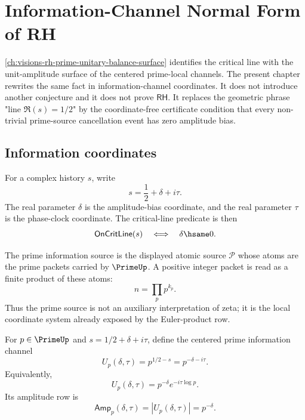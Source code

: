 \chapter{Information-Channel Normal Form of RH}
\label{ch:visions-rh-information-channel-normal-form}

\autoref{ch:visions-rh-prime-unitary-balance-surface} identifies the critical
line with the unit-amplitude surface of the centered prime-local channels.
The present chapter rewrites the same fact in information-channel
coordinates.  It does not introduce another conjecture and it does not prove
$\mathsf{RH}$.  It replaces the geometric phrase "line $\Re(s)=1/2$" by the
coordinate-free certificate condition that every non-trivial prime-source
cancellation event has zero amplitude bias.

\section{Information coordinates}
\label{sec:rh-information-coordinates}

\begin{definition}
\label{def:rh-bias-clock-coordinates}
For a complex history $s$, write
$$
s=\frac{1}{2}+\delta+i\tau.
$$
The real parameter $\delta$ is the amplitude-bias coordinate, and the real
parameter $\tau$ is the phase-clock coordinate.  The critical-line predicate
is then
$$
\mathsf{OnCritLine}(s)
\quad\Longleftrightarrow\quad
\delta\hsame 0.
$$
\end{definition}

\begin{definition}
\label{def:rh-prime-information-source}
The prime information source is the displayed atomic source $\mathcal P$
whose atoms are the prime packets carried by $\PrimeUp$.  A positive
integer packet is read as a finite product of these atoms:
$$
n=\prod_p p^{k_p}.
$$
Thus the prime source is not an auxiliary interpretation of zeta; it is the
local coordinate system already exposed by the Euler-product row.
\end{definition}

\begin{definition}
\label{def:rh-centered-information-channel}
For $p\in\PrimeUp$ and $s=1/2+\delta+i\tau$, define the centered prime
information channel
$$
U_p(\delta,\tau)=p^{1/2-s}=p^{-\delta-i\tau}.
$$
Equivalently,
$$
U_p(\delta,\tau)=p^{-\delta}e^{-i\tau\log p}.
$$
Its amplitude row is
$$
\mathsf{Amp}_p(\delta,\tau)=|U_p(\delta,\tau)|=p^{-\delta}.
$$
\end{definition}

